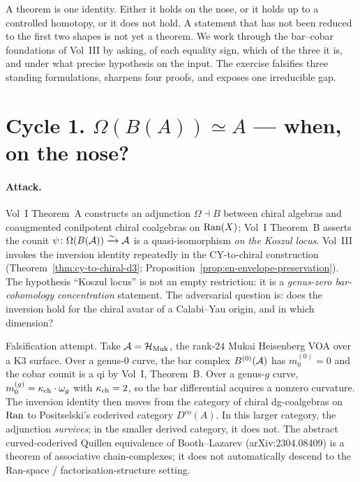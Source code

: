 A theorem is one identity. Either it holds on the nose, or it
holds up to a controlled homotopy, or it does not hold. A statement
that has not been reduced to the first two shapes is not yet a
theorem. We work through the bar--cobar foundations of Vol~III by
asking, of each equality sign, which of the three it is, and under
what precise hypothesis on the input. The exercise falsifies three
standing formulations, sharpens four proofs, and exposes one
irreducible gap.

\section*{Cycle 1. $\Omega(B(A)) \simeq A$ --- when, on the nose?}

\paragraph{Attack.} Vol~I Theorem~A constructs an adjunction
$\Omega \dashv B$ between chiral algebras and coaugmented conilpotent
chiral coalgebras on $\mathrm{Ran}(X)$; Vol~I Theorem~B asserts the counit
$\psi \colon \Omega(B(\mathcal{A})) \xrightarrow{\sim} \mathcal{A}$ is a
quasi-isomorphism \emph{on the Koszul locus}. Vol~III invokes the
inversion identity repeatedly in the CY-to-chiral construction
(Theorem~\ref{thm:cy-to-chiral-d3}; Proposition~\ref{prop:en-envelope-preservation}).
The hypothesis ``Koszul locus'' is not an empty restriction:
it is a \emph{genus-zero bar-cohomology concentration} statement.
The adversarial question is: does the inversion hold for
the chiral avatar of a Calabi--Yau origin, and in which dimension?

Falsification attempt. Take $\mathcal{A} = \mathcal{H}_{\mathrm{Muk}}$, the rank-$24$
Mukai Heisenberg VOA over a K3 surface.  Over a genus-$0$ curve, the
bar complex $B^{(0)}(\mathcal{A})$ has $m_0^{(0)} = 0$ and the cobar counit
is a qi by Vol~I, Theorem~B. Over a genus-$g$ curve,
$m_0^{(g)} = \kappa_{\mathrm{ch}} \cdot \omega_g$ with $\kappa_{\mathrm{ch}} = 2$, so the bar
differential acquires a nonzero curvature. The inversion
identity then moves from the category of chiral dg-coalgebras on
$\mathrm{Ran}$ to Positselski's coderived category
$D^{\mathrm{co}}(A)$. In this larger category, the
adjunction \emph{survives}; in the smaller derived category, it
does not. The abstract curved-coderived Quillen equivalence of
Booth--Lazarev (arXiv:2304.08409) is a theorem of associative
chain-complexes; it does not automatically descend to the
Ran-space / factorisation-structure setting.

